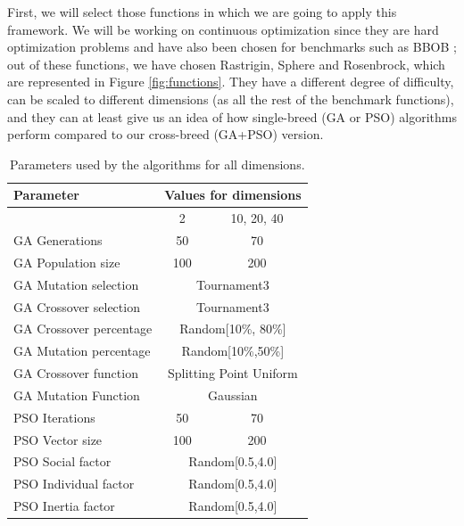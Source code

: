 \documentclass[runningheads]{llncs}
\begin{document}
First, we will select those functions in which we are going to apply this framework. We
will be working on continuous optimization since they are hard optimization
problems and have also been chosen for benchmarks such as BBOB
\cite{hansen2010bbob}; out of these functions, we have chosen Rastrigin, Sphere
and Rosenbrock, which are represented in Figure \ref{fig:functions}. They have a
different degree of difficulty, can be scaled to different dimensions (as all
the rest of the benchmark functions), and they can at least give us an idea of
how single-breed (GA or PSO) algorithms perform compared to our cross-breed
(GA+PSO) version.  

   \begin{table}[h!tp]
    \caption{Parameters used by the algorithms for all dimensions.}
    \label{table:ga-pso-parameters}
    \centering
    \begin{tabular}{|l|c|c|}
    \hline
    Parameter & \multicolumn{2}{c|}{Values for dimensions} \\
      \hline
      & 2 & 10, 20, 40 \\
    \hline
    GA Generations & 50 &  70\\
    \hline
     GA Population size & 100 & 200\\
    \hline
    GA Mutation selection &  \multicolumn{2}{c|}{Tournament3}\\
    \hline
    GA Crossover selection & \multicolumn{2}{c|}{Tournament3} \\
    \hline
    GA Crossover percentage & \multicolumn{2}{c|}{Random[10\%, 80\%]} \\
    \hline
    GA Mutation percentage & \multicolumn{2}{c|}{Random[10\%,50\%]} \\
    \hline
    GA Crossover function & \multicolumn{2}{c|}{Splitting Point Uniform} \\
    \hline
    GA Mutation Function & \multicolumn{2}{c|}{Gaussian} \\
      \hline 
      \hline
    PSO Iterations & 50 & 70\\
    \hline
    PSO Vector size & 100 & 200\\
    \hline
    PSO Social factor & \multicolumn{2}{c|}{Random[0.5,4.0]} \\
    \hline
    PSO Individual factor & \multicolumn{2}{c|}{Random[0.5,4.0]} \\
    \hline
    PSO Inertia factor & \multicolumn{2}{c|}{Random[0.5,4.0]} \\
    \hline
    \end{tabular}
\end{table}
\end{document}
